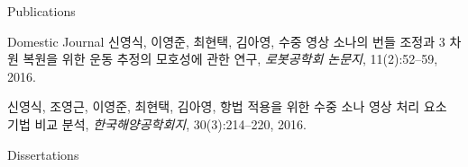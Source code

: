 \begin{rSection}{Publications}
\begin{pubSubsection}{Domestic Journal}
	신영식, 이영준, 최현택, 김아영,
	수중 영상 소나의 번들 조정과 3 차원 복원을 위한 운동 추정의 모호성에 관한 연구,
	\textit{로봇공학회 논문지}, 11(2):52--59, 2016.

	신영식, 조영근, 이영준, 최현택, 김아영,
	항법 적용을 위한 수중 소나 영상 처리 요소 기법 비교 분석,
	\textit{한국해양공학회지}, 30(3):214--220, 2016.
\end{pubSubsection}




\begin{pubSubsection}{Dissertations}
  \item {}
  \item {}
\end{pubSubsection}


\end{rSection}

